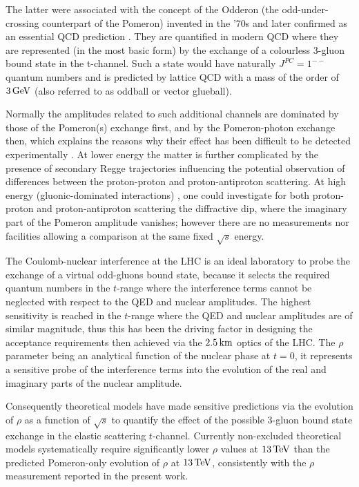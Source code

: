 The latter were associated with the concept of the Odderon (the odd-under-crossing counterpart of the Pomeron) invented in the '70s \cite{nicolescu-1973,nicolescu-1975} and later confirmed as an essential QCD prediction \cite{lipatov-1986}. They are quantified in modern QCD \cite{durham-2015-review} where they are represented (in the most basic form) by the exchange of a colourless 3-gluon bound state in the t-channel. Such a state would have naturally $J^{PC}=1^{--}$ quantum numbers and is predicted by lattice QCD with a mass of the order of $3\,{\rm GeV}$ (also referred to as oddball or vector glueball).

Normally the amplitudes related to such additional channels are dominated by those of the Pomeron(s) exchange first, and by the Pomeron-photon exchange then, which explains the reasons why their effect has been difficult to be detected experimentally \cite{hera-odderon-2002}. At lower energy \cite{breakstone-85} the matter is further complicated by the presence of secondary Regge trajectories influencing the potential observation of differences between the proton-proton and proton-antiproton scattering. At high energy (gluonic-dominated interactions) \cite{yellow-report}, one could investigate for both proton-proton and proton-antiproton scattering the diffractive dip, where the imaginary part of the Pomeron amplitude vanishes; however there are no measurements nor facilities allowing a comparison at the same fixed $\sqrt s$ energy.

The Coulomb-nuclear interference at the LHC is an ideal laboratory to probe the exchange of a virtual odd-gluons bound state, because it selects the required quantum numbers in the $t$-range where the interference terms cannot be neglected with respect to the QED and nuclear amplitudes. The highest sensitivity is reached in the $t$-range where the QED and nuclear amplitudes are of similar magnitude, thus this has been the driving factor in designing the acceptance requirements then achieved via the $2.5\,{\rm km}$ optics of the LHC. The $\rho$ parameter being an analytical function of the nuclear phase at $t=0$, it represents a sensitive probe of the interference terms into the evolution of the real and imaginary parts of the nuclear amplitude.

Consequently theoretical models have made sensitive predictions via the evolution of $\rho$ as a function of $\sqrt s$ to quantify the effect of the possible 3-gluon bound state exchange in the elastic scattering $t$-channel. Currently non-excluded theoretical models systematically require significantly lower $\rho$ values at $13\,{\rm TeV}$ than the predicted Pomeron-only evolution of $\rho$ at $13\,{\rm TeV}$, consistently with the $\rho$ measurement reported in the present work.

